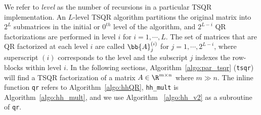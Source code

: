 		We refer to \emph{level} as the number of recursions in a particular TSQR implementation. 
		An $L$-level TSQR algorithm partitions the original matrix into $2^L$ submatrices in the initial or $0^{th}$ level of the algorithm, and $2^{L-i}$ QR factorizations are performed in level $i$ for $i = 1 , \cdots, L$. 
		The set of matrices that are QR factorized at each level $i$ are called $\bb{A}_j^{(i)}$ for $j = 1, \cdots, 2^{L-i}$, where superscript $(i)$ corresponds to the level and the subscript $j$ indexes the row-blocks within level $i$.
		In the following sections, Algorithm~\ref{algo:par_tsqr} ({\tt tsqr}) will find a TSQR factorization of a matrix $A\in\R^{m\times n}$ where $m \gg n$. 
		The inline function {\tt qr} refers to Algorithm~\ref{algo:hhQR}, {\tt hh\_mult} is Algorithm~\ref{algo:hh_mult}, and we use Algorithm ~\ref{algo:hh_v2} as a subroutine of {\tt qr}.

%		
%		

